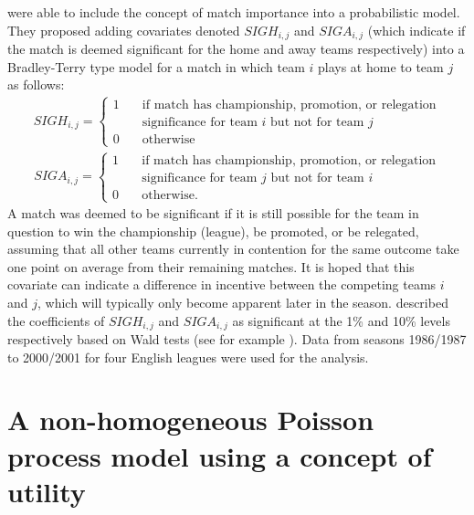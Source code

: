 \cite{goddard2003} were able to include the concept of match importance into a probabilistic model. They proposed adding
covariates denoted \(SIGH_{i, j}\) and \(SIGA_{i, j}\) (which indicate if the match is deemed significant for the home
and away teams respectively) into a Bradley-Terry type model for a match in which team \(i\) plays at home to team \(j\)
as follows:
\begin{align}
SIGH_{i, j} = \left \{
\begin{array}{ll}
1 \quad & \text{if match has championship, promotion, or relegation}\\
  \quad	& \text{significance for team \(i\) but not for team \(j\)}\\
0 \quad & \text{otherwise}
\end{array} \right.
\end{align}
\begin{align}
SIGA_{i, j} = \left \{
\begin{array}{ll}
1 \quad & \text{if match has championship, promotion, or relegation}\\
  \quad	& \text{significance for team \(j\) but not for team \(i\)}\\
0 \quad & \text{otherwise.}
\end{array} \right.
\end{align}
A match was deemed to be significant if it is still possible for the team in question to win the championship (league),
be promoted, or be relegated, assuming that all other teams currently in contention for the same outcome take one point
on average from their remaining matches. It is hoped that this covariate can indicate a difference in incentive between
the competing teams \(i\) and \(j\), which will typically only become apparent later in the season.
\cite{goddard2003} described the coefficients of \(SIGH_{i, j}\) and \(SIGA_{i, j}\) as significant at the 1\% and 10\%
levels respectively based on Wald tests (see for example \cite{hosmer2013}). Data from seasons 1986/1987 to 2000/2001
for four English leagues were used for the analysis.

\section{A non-homogeneous Poisson process model using a concept of utility}
\label{sec:A_model_using_utility_functions}

